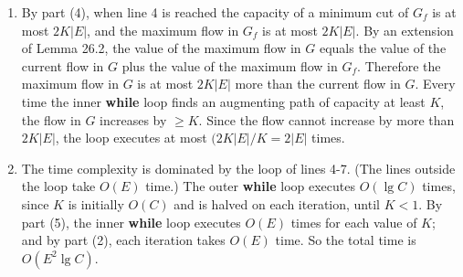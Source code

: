 \documentclass{article}[12pt]
\begin{document}
\begin{enumerate}
	\item By part (4), when line 4 is reached the capacity of a minimum cut of $G_f$ is at most $2K|E|$, and the maximum flow in $G_f$ is at most $2K|E|$. By an extension of Lemma 26.2, the value of the maximum flow in $G$ equals the value of the current flow in $G$ plus the value of the maximum flow in $G_f$. Therefore the maximum flow in $G$ is at most $2K|E|$ more than the current flow in $G$. Every time the inner \textbf{while} loop finds an augmenting path of capacity at least $K$, the flow in $G$ increases by $\geq K$. Since the flow cannot increase by more than $2K|E|$, the loop executes at most $(2K|E|/K=2|E|$ times. 
	\item The time complexity is dominated by the loop of lines 4-7. (The lines outside the loop take $O(E)$ time.) The outer \textbf{while} loop executes $O(\lg C)$ times, since $K$ is initially $O(C)$ and is halved on each iteration, until $K<1$. By part (5), the inner \textbf{while} loop executes $O(E)$ times for each value of $K$; and by part (2), each iteration takes $O(E)$ time. So the total time is $O(E^2\lg C)$. 
  
	
\end{enumerate}
\end{document}
